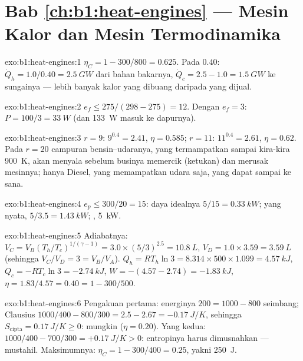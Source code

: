 \section*{Bab \ref{ch:b1:heat-engines} --- Mesin Kalor dan Mesin Termodinamika}

\begin{solution}{exo:b1:heat-engines:1}
$\eta_C = 1 - 300/800 = 0.625$. Pada $0.40$: $\dot Q_h = 1.0/0.40 = \qty{2.5}{GW}$
dari bahan bakarnya, $\dot Q_c = 2.5 - 1.0 = \qty{1.5}{GW}$ ke sungainya --- lebih banyak
kalor yang dibuang daripada yang dijual.
\end{solution}

\begin{solution}{exo:b1:heat-engines:2}
$e_f \leq 275/(298 - 275) = 12$. Dengan $e_f = 3$: $P = 100/3 = \qty{33}{W}$
(dan \qty{133}{W} masuk ke dapurnya).
\end{solution}

\begin{solution}{exo:b1:heat-engines:3}
$r = 9$: $9^{0.4} = 2.41$, $\eta = 0.585$; $r = 11$: $11^{0.4} = 2.61$,
$\eta = 0.62$. Pada $r = 20$ campuran bensin--udaranya, yang termampatkan sampai kira-kira
\qty{900}{K}, akan menyala sebelum businya memercik (ketukan) dan merusak
mesinnya; hanya Diesel, yang memampatkan udara saja, yang dapat sampai ke sana.
\end{solution}

\begin{solution}{exo:b1:heat-engines:4}
$e_p \leq 300/20 = 15$: daya idealnya $5/15 = \qty{0.33}{kW}$; yang nyata, $5/3.5 =
\qty{1.43}{kW}$; , \qty{5}{kW}.
\end{solution}

\begin{solution}{exo:b1:heat-engines:5}
Adiabatnya: $V_C = V_B(T_h/T_c)^{1/(\gamma-1)} = 3.0 \times (5/3)^{2.5} =
\qty{10.8}{L}$, $V_D = 1.0 \times 3.59 = \qty{3.59}{L}$ (sehingga $V_C/V_D = 3 =
V_B/V_A$). $Q_h = RT_h\ln3 = 8.314 \times 500 \times 1.099 = \qty{4.57}{kJ}$,
$Q_c = -RT_c\ln3 = \qty{-2.74}{kJ}$, $W = -(4.57 - 2.74) = \qty{-1.83}{kJ}$,
$\eta = 1.83/4.57 = 0.40 = 1 - 300/500$.
\end{solution}

\begin{solution}{exo:b1:heat-engines:6}
Pengakuan pertama: energinya $200 = 1000 - 800$ seimbang; Clausius $1000/400 - 800/300
= 2.5 - 2.67 = \qty{-0.17}{J/K}$, sehingga $S_{\mathrm{cipta}} = \qty{0.17}{J/K} \geq 0$:
mungkin ($\eta = 0.20$). Yang kedua: $1000/400 - 700/300 = +\qty{0.17}{J/K} > 0$:
entropinya harus dimusnahkan --- mustahil. Maksimumnya: $\eta_C = 1 -
300/400 = 0.25$, yakni \qty{250}{J}.
\end{solution}

